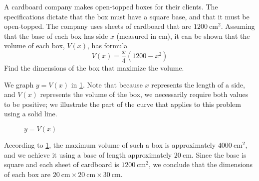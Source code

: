 \begin{pccexample} 
	A cardboard company makes open-topped boxes for their clients. The specifications
	dictate that the box must have a square base, and that it must be open-topped. 
	The company uses sheets of cardboard that are $\SI{1200}{\centi\meter\squared}$. Assuming that 
	the base of each box has side $x$ (measured in cm), it can be shown that the volume of each box, $V(x)$,
	has formula
	\[
		V(x)=\frac{x}{4}(1200-x^2)
	\]
	Find the dimensions of the box that maximize the volume.
	\begin{pccsolution}
		We graph $y=V(x)$ in \cref{poly:fig:opentoppedbox}. Note that because 
		$x$ represents the length of a side, and $V(x)$ represents the volume
		of the box, we necessarily require both values to be positive; we illustrate
		the part of the curve that applies to this problem using a solid line. 
		
		\begin{figure}[!htb]
			\centering
			\caption{$y=V(x)$}
			\label{poly:fig:opentoppedbox}
		\end{figure}
		
		According to \cref{poly:fig:opentoppedbox}, the maximum volume of such a box is 
		approximately $\SI{4000}{\centi\meter\squared}$, and we achieve it using a base of length 
		approximately $\SI{20}{\centi\meter}$. Since the base is square and each sheet of cardboard
		is $\SI{1200}{\centi\meter\squared}$, we conclude that the dimensions of each box are $\SI{20}{\centi\meter}\times\SI{20}{\centi\meter}\times\SI{30}{\centi\meter}$.
	\end{pccsolution}
\end{pccexample}

